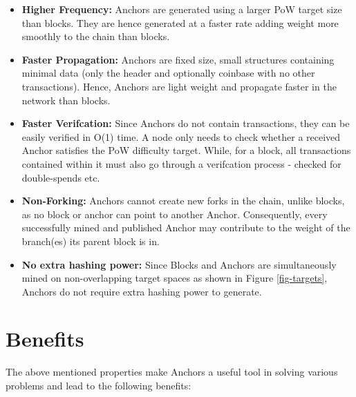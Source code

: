 \begin{itemize}
    \item \textbf{Higher Frequency: } 
        Anchors are generated using a larger PoW target size than blocks. 
        They are hence generated at a faster rate adding weight more smoothly to the chain than blocks. 

    \item \textbf{Faster Propagation: }
        Anchors are fixed size, small structures containing minimal data (only the header and optionally coinbase with no other transactions). Hence, Anchors are light weight and propagate faster in the network than blocks.
    
    \item \textbf{Faster Verifcation: }
        Since Anchors do not contain transactions, they can be easily verified in O(1) time. 
        A node only needs to check whether a received Anchor satisfies the PoW difficulty target. 
        While, for a block, all transactions contained within it must also go through a verifcation process - checked for double-spends etc.
    
    \item \textbf{Non-Forking: }
        Anchors cannot create new forks in the chain, unlike blocks, as no block or anchor can point to another Anchor. Consequently, every successfully mined and published Anchor may contribute to the weight of the branch(es) its parent block is in.
    

    \item \textbf{No extra hashing power: } 
        Since Blocks and Anchors are simultaneously mined on non-overlapping target spaces as shown in Figure \ref{fig-targets}, Anchors do not require extra hashing power to generate.

\end{itemize}


\section{Benefits} \label{anc-benefits}

The above mentioned properties make Anchors a useful tool in solving various problems and lead to the following benefits:

